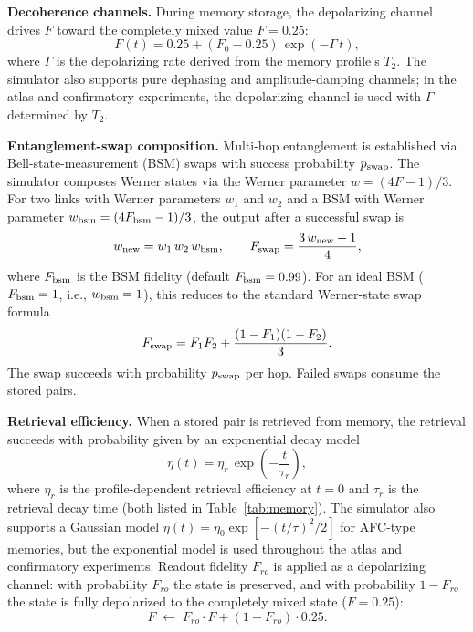 \documentclass[quantumrep,article,submit,moreauthors]{Definitions/mdpi}
\begin{document}
\textbf{Decoherence channels.} During memory storage, the depolarizing channel drives $F$ toward the completely mixed value $F = 0.25$:
\begin{equation}
F(t) = 0.25 + (F_0 - 0.25)\,\exp(-\Gamma\, t),
\end{equation}
where $\Gamma$ is the depolarizing rate derived from the memory profile's $T_2$. The simulator also supports pure dephasing and amplitude-damping channels; in the atlas and confirmatory experiments, the depolarizing channel is used with $\Gamma$ determined by $T_2$.

\textbf{Entanglement-swap composition.} Multi-hop entanglement is established via Bell-state-measurement (BSM) swaps with success probability $p_{\rm swap}$. The simulator composes Werner states via the Werner parameter $w = (4F - 1)/3$. For two links with Werner parameters $w_1$ and $w_2$ and a BSM with Werner parameter $w_{\rm bsm} = (4 F_{\rm bsm} - 1)/3$, the output after a successful swap is
\begin{equation}
w_{\rm new} = w_1 \, w_2 \, w_{\rm bsm}, \qquad F_{\rm swap} = \frac{3\, w_{\rm new} + 1}{4},
\end{equation}
where $F_{\rm bsm}$ is the BSM fidelity (default $F_{\rm bsm} = 0.99$). For an ideal BSM ($F_{\rm bsm} = 1$, i.e., $w_{\rm bsm} = 1$), this reduces to the standard Werner-state swap formula
\begin{equation}
F_{\rm swap} = F_1 F_2 + \frac{(1-F_1)(1-F_2)}{3}.
\end{equation}
The swap succeeds with probability $p_{\rm swap}$ per hop. Failed swaps consume the stored pairs.

\textbf{Retrieval efficiency.} When a stored pair is retrieved from memory, the retrieval succeeds with probability given by an exponential decay model
\begin{equation}
\eta(t) = \eta_r \, \exp\!\left(-\frac{t}{\tau_r}\right),
\end{equation}
where $\eta_r$ is the profile-dependent retrieval efficiency at $t = 0$ and $\tau_r$ is the retrieval decay time (both listed in Table~\ref{tab:memory}). The simulator also supports a Gaussian model $\eta(t) = \eta_0 \exp[-(t/\tau)^2/2]$ for AFC-type memories, but the exponential model is used throughout the atlas and confirmatory experiments. Readout fidelity $F_{ro}$ is applied as a depolarizing channel: with probability $F_{ro}$ the state is preserved, and with probability $1 - F_{ro}$ the state is fully depolarized to the completely mixed state ($F = 0.25$):
\begin{equation}
F \;\leftarrow\; F_{ro} \cdot F + (1 - F_{ro}) \cdot 0.25.
\label{eq:readout}
\end{equation}
\end{document}
